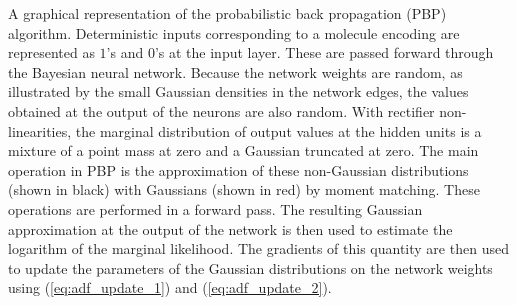 A graphical representation of the probabilistic back propagation (PBP)
algorithm. Deterministic inputs corresponding to a molecule encoding are represented as $1$'s and $0$'s at the input
layer. These are passed forward through the Bayesian neural network. Because the network weights are random, as illustrated
by the small Gaussian densities in the network edges, the values obtained at the output of the
neurons are also random. With rectifier non-linearities, the marginal distribution of output values at the hidden units is a mixture
of a point mass at zero and a Gaussian truncated at zero. 
The main operation in PBP is the approximation of
these non-Gaussian distributions (shown in black) with Gaussians (shown in red) by moment matching. These
operations are performed in a forward pass. The resulting Gaussian
approximation at the output of the network is then used to estimate the
logarithm of the marginal likelihood. The gradients of this quantity are then
used to update the parameters of the Gaussian distributions on the network
weights using (\ref{eq:adf_update_1}) and (\ref{eq:adf_update_2}).
\label{fig:pbp}